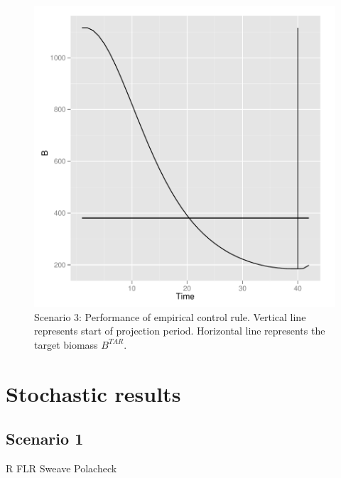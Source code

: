 \documentclass[a4paper]{article}
\begin{document}
\begin{figure}
\centering
\includegraphics{script-hcr_plot_sc3}
\caption{Scenario 3: Performance of empirical control rule. Vertical line represents start of projection period. 
Horizontal line represents the target biomass $B^{TAR}$.}
\label{fig:hcr_proj_biomass_sc3}
\end{figure}

\section{Stochastic results}

\subsection{Scenario 1}




\newpage


R
FLR
Sweave
Polacheck
\end{document}
